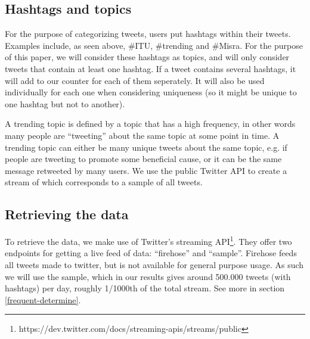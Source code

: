 \subsection{Hashtags and topics}
For the purpose of categorizing tweets, users put hashtags within their tweets. Examples include, as seen above, \#ITU, \#trending and \#Misra. For the purpose of this paper, we will consider these hashtags as topics, and will only consider tweets that contain at least one hashtag. If a tweet contains several hashtags, it will add to our counter for each of them seperately. It will also be used individually for each one when considering uniqueness (so it might be unique to one hashtag but not to another).

A trending topic is defined by a topic that has a high frequency, in other words many people are ``tweeting'' about the same topic at some point in time. A trending topic can either be many unique tweets about the same topic, e.g. if people are tweeting to promote some beneficial cause, or it can be the same message retweeted by many users. We use the public Twitter API to create a stream of which corresponds to a sample of all tweets. 

\subsection{Retrieving the data}
To retrieve the data, we make use of Twitter's streaming API\footnote{https://dev.twitter.com/docs/streaming-apis/streams/public}. They offer two endpoints for getting a live feed of data: ``firehose'' and ``sample''. Firehose feeds all tweets made to twitter, but is not available for general purpose usage. As such we will use the sample, which in our results gives around 500.000 tweets (with hashtags) per day, roughly 1/1000th of the total stream. See more in section \ref{frequent-determine}.
